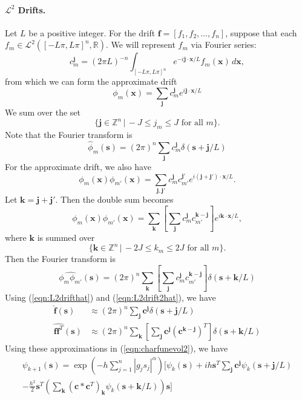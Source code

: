 \documentclass[12pt]{article}
\begin{document}
\paragraph{$\mathcal{L}^2$ Drifts.} Let $L$ be a positive integer. For the drift $\mathbf{f} = [f_1, f_2, \ldots, f_n]$, suppose that each $f_m \in \mathcal{L}^2([-L \pi, L \pi]^n, \mathbb{R})$.  We will represent $f_m$ via Fourier series:
\[
c^\mathbf{j}_m = (2 \pi L)^{-n} \int_{ [-L\pi, L\pi]^n } e^{-i \mathbf{j} \cdot \mathbf{x} / L} f_m( \mathbf{x} ) \, d\mathbf{x},
\] 
from which we can form the approximate drift
\[
\phi_m (\mathbf{x}) = \sum_{\mathbf{j}} c^\mathbf{j}_m e^{i \mathbf{j} \cdot \mathbf{x} / L}
\]
We sum over the set
\[
\{ \mathbf{j} \in \mathbb{Z}^n \, | \, -J \leq j_m \leq J \text{ for all } m \}.
\]
Note that the Fourier transform is
\begin{equation}
\label{eqn:L2drifthat}
\widehat{\phi}_m (\mathbf{s}) = (2 \pi)^n \sum_{\mathbf{j}} c^{\mathbf{j}}_m \delta(\mathbf{s} + \mathbf{j}/L)
\end{equation}
For the approximate drift, we also have 
\[
\phi_{m} (\mathbf{x}) \phi_{m'} (\mathbf{x}) = \sum_{\mathbf{j}, \mathbf{j}'} c^{\mathbf{j}}_m c^{\mathbf{j}'}_{m'} e^{i (\mathbf{j}+ \mathbf{j}') \cdot \mathbf{x}/L }.
\]
Let $\mathbf{k} = \mathbf{j} + \mathbf{j}'$.  Then the double sum becomes
\[
\phi_{m} (\mathbf{x}) \phi_{m'} (\mathbf{x}) = \sum_{\mathbf{k}} \left[ \sum_{\mathbf{j}}  c^{\mathbf{j}}_m c^{\mathbf{k} - \mathbf{j}}_{m'} \right]  e^{i \mathbf{k} \cdot \mathbf{x} / L },
\]
where $\mathbf{k}$ is summed over
\[
\{ \mathbf{k} \in \mathbb{Z}^n \, | \, -2 J \leq k_m \leq 2 J \text{ for all } m \}.
\]
Then the Fourier transform is
\begin{equation}
\label{eqn:L2drift2hat}
\widehat{ \phi_m \phi_{m'} }(\mathbf{s}) = (2 \pi)^n \sum_{\mathbf{k}} \left[ \sum_{\mathbf{j}}  c^{\mathbf{j}}_m c^{\mathbf{k} - \mathbf{j}}_{m'} \right] \delta(\mathbf{s} + \mathbf{k} / L)
\end{equation}
Using (\ref{eqn:L2drifthat}) and (\ref{eqn:L2drift2hat}), we have
\begin{align*}
\widehat{\mathbf{f}} (\mathbf{s}) &\approx (2 \pi)^n \sum_{\mathbf{j}} \mathbf{c}^{\mathbf{j}} \delta(\mathbf{s} + \mathbf{j}/L) \\
\widehat{\mathbf{f} \mathbf{f}^T} (\mathbf{s}) &\approx (2 \pi)^n \sum_{\mathbf{k}} \left[ \sum_{\mathbf{j}}  \mathbf{c}^{\mathbf{j}} \left( \mathbf{c}^{\mathbf{k} - \mathbf{j}} \right)^T \right] \delta(\mathbf{s} + \mathbf{k} / L)
\end{align*}
Using these approximations in (\ref{eqn:charfunevol2}), we have
\begin{multline}
	\label{eqn:charfunevol3}
	\psi_{k+1}(\mathbf{s}) = \exp\left( -h \sum_{j=1}^n |g_j s_j|^\alpha \right) \biggl[ \psi_k(\mathbf{s}) + i h \mathbf{s}^T  \sum_{\mathbf{j}} \mathbf{c}^{\mathbf{j}} \psi_k(\mathbf{s} + \mathbf{j}/L)  \\
	- \frac{h^2}{2} \mathbf{s}^T \left(  \sum_{\mathbf{k}} \left( \mathbf{c} \ast  \mathbf{c}^T \right)_{\mathbf{k}}  \psi_k(\mathbf{s} + \mathbf{k} / L) \right) \mathbf{s}   \biggr] 
\end{multline}
\end{document}
